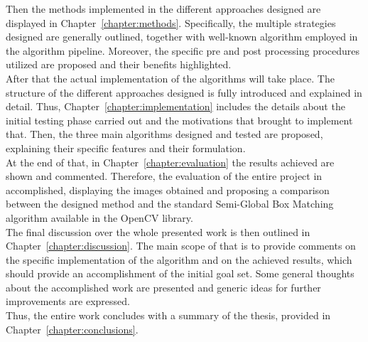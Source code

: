 Then the methods implemented in the different approaches designed are displayed in Chapter~\ref{chapter:methods}. 
Specifically, the multiple strategies designed are generally outlined, together with well-known algorithm employed in the algorithm pipeline.
Moreover, the specific pre and post processing procedures utilized are proposed and their benefits highlighted. \\ 
After that the actual implementation of the algorithms will take place. 
The structure of the different approaches designed is fully introduced and explained in detail.
Thus, Chapter~\ref{chapter:implementation} includes the details about the initial testing phase carried out and the motivations that brought to implement that. 
Then, the three main algorithms designed and tested are proposed, explaining their specific features and their formulation.\\
At the end of that, in Chapter~\ref{chapter:evaluation} the results achieved are shown and commented.
Therefore, the evaluation of the entire project in accomplished, displaying the images obtained and proposing a comparison between the designed method and the standard Semi-Global Box Matching algorithm available in the OpenCV library. \\
The final discussion over the whole presented work is then outlined in Chapter~\ref{chapter:discussion}.
The main scope of that is to provide comments on the specific implementation of the algorithm and on the achieved results, which should provide an accomplishment of the initial goal set.
Some general thoughts about the accomplished work are presented and generic ideas for further improvements are expressed.\\
Thus, the entire work concludes with a summary of the thesis, provided in Chapter~\ref{chapter:conclusions}.


